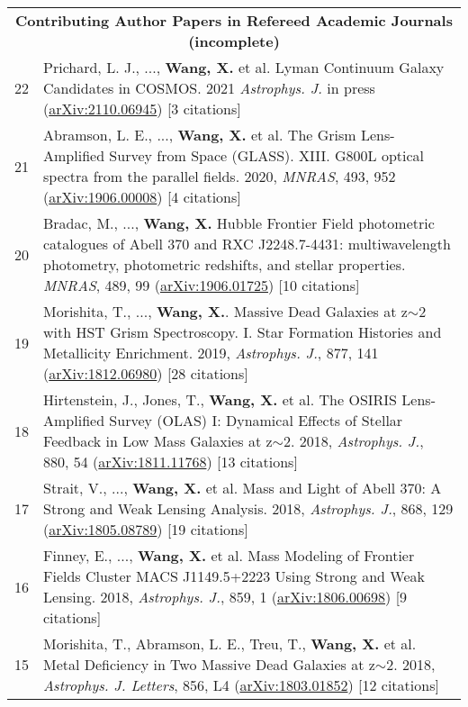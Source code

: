 \documentclass[letterpaper,10pt]{article}
\newcommand{\narrow}{-1.8ex}
\begin{document}
\begin{longtable}{rp{6.3in}}
\\[\narrow]
    \multicolumn{2}{c}{\textbf{Contributing Author Papers in Refereed Academic Journals (incomplete)}}      \\

22  &   Prichard, L. J., ..., \textbf{Wang, X.} et al. Lyman Continuum Galaxy Candidates in COSMOS. 2021 \textit{Astrophys. J.} in 
    press (\href{https://arxiv.org/abs/2110.06945}{arXiv:2110.06945}) [3 citations]  \\
21  &   Abramson, L. E., ..., \textbf{Wang, X.} et al. The Grism Lens-Amplified Survey from Space (GLASS). XIII. G800L optical spectra from the 
    parallel fields. 2020, \textit{MNRAS}, 493, 952 (\href{https://arxiv.org/abs/1906.00008}{arXiv:1906.00008}) [4 citations]  \\
20  &   Bradac, M., ..., \textbf{Wang, X.} Hubble Frontier Field photometric catalogues of Abell 370 and RXC J2248.7-4431: 
    multiwavelength photometry, photometric redshifts, and stellar properties. \textit{MNRAS}, 489, 99 
    (\href{https://arxiv.org/abs/1906.01725}{arXiv:1906.01725}) [10 citations]  \\
19  &   Morishita, T., ..., \textbf{Wang, X.}. Massive Dead Galaxies at z$\sim$2 with HST Grism Spectroscopy. I. Star Formation Histories and 
    Metallicity Enrichment. 2019, \textit{Astrophys. J.}, 877, 141 (\href{https://arxiv.org/abs/1812.06980}{arXiv:1812.06980}) [28 citations] \\
18  &   Hirtenstein, J., Jones, T., \textbf{Wang, X.} et al. The OSIRIS Lens-Amplified Survey (OLAS) I: Dynamical Effects of Stellar Feedback in Low 
    Mass Galaxies at z$\sim$2. 2018, \textit{Astrophys. J.}, 880, 54 (\href{https://arxiv.org/abs/1811.11768}{arXiv:1811.11768}) 
    [13 citations] \\
17  &   Strait, V., ..., \textbf{Wang, X.} et al. Mass and Light of Abell 370: A Strong and Weak Lensing Analysis. 2018, \textit{Astrophys. J.}, 868, 
    129 (\href{https://arxiv.org/abs/1805.08789}{arXiv:1805.08789}) [19 citations] \\
16  &   Finney, E., ..., \textbf{Wang, X.} et al. Mass Modeling of Frontier Fields Cluster MACS J1149.5+2223 Using Strong and Weak Lensing. 2018, 
    \textit{Astrophys. J.}, 859, 1 (\href{https://arxiv.org/abs/1806.00698}{arXiv:1806.00698}) [9 citations] \\
15  &   Morishita, T., Abramson, L. E., Treu, T., \textbf{Wang, X.} et al.  Metal Deficiency in Two Massive Dead Galaxies at z$\sim$2. 2018, 
    \textit{Astrophys. J. Letters}, 856, L4 (\href{https://arxiv.org/abs/1803.01852}{arXiv:1803.01852}) [12 citations]  \\

\end{longtable}
\end{document}
